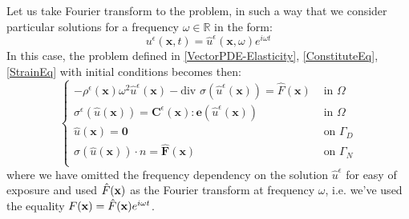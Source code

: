 Let us take Fourier transform to the problem, in such a way that we consider particular solutions for a frequency $\omega \in \mathbb{R}$ in the form:
\begin{equation}
    \label{FreqAnsatz}
    u^{\epsilon}(\mathbf{x},t) = \hat{u}^{\epsilon}(\mathbf{x},\omega) e^{i \omega t}
\end{equation}
In this case, the problem defined in \ref{VectorPDE-Elasticity}, \ref{ConstituteEq}, \ref{StrainEq} with initial conditions becomes then:
\begin{equation}
    \label{VectorPDE-Freq}
    \left \{
    \begin{array}{cc}
        -\rho^{\epsilon} (\mathbf{x}) \omega^2 \hat{u}^{\epsilon}(\mathbf{x}) - \text{div }\sigma (\hat{u}^{\epsilon}(\mathbf{x})) = \hat{F}(\mathbf{x})  & \text{ in }  \Omega \\
        \sigma^{\epsilon} (\hat{u}(\mathbf{x})) = \mathbf{C}^{\epsilon}(\mathbf{x}): \mathbf{e} (\hat{u}^{\epsilon}(\mathbf{x})) & \text{ in } \Omega  \\
        \hat{u}(\mathbf{x}) = \mathbf{0} & \text{ on } \Gamma_D\\
        \sigma (\hat{u}(\mathbf{x}))\cdot n = \hat{\mathbf{F}}(\mathbf{x}) & \text{ on } \Gamma_N \\
    \end{array}
    \right .
\end{equation}
where we have omitted the frequency dependency on the solution $\hat{u}^{\epsilon}$ for easy of exposure and used $\Hat{F}(\mathbf{x})$ as the Fourier transform at frequency $\omega$, i.e. we've used the equality $F(\mathbf{x}) = \Hat{F}(\mathbf{x})e^{i \omega t}$.

